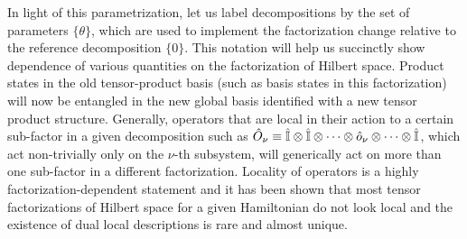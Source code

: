 \documentclass[aps,pra,onecolumn,nofootinbib,12pt,tightenlines]{revtex4-1}
\begin{document}
In light of this parametrization, let us label decompositions by the set of parameters $\{\theta \}$, which are used to implement the factorization change relative to the reference decomposition $\{0\}$. This notation will help us succinctly show dependence of various quantities on the factorization of Hilbert space. Product states in the old tensor-product basis (such as basis states in this factorization) will now be entangled in the new global basis identified with a new tensor product structure. Generally, operators that are local in their action to a certain sub-factor in a given decomposition such as $\hat{O}_{\nu} \equiv \hat{\mathbb{I}} \otimes \hat{\mathbb{I}} \otimes \cdots \otimes \hat{o}_{\nu} \otimes \cdots  \otimes \hat{\mathbb{I}}$, which act non-trivially only on the $\nu$-th subsystem, will generically act on more than one sub-factor in a different factorization. Locality of operators is a highly factorization-dependent statement and it has been shown \cite{cotler2019locality} that most tensor factorizations of Hilbert space for a given Hamiltonian do not look local and the existence of dual local descriptions is rare and almost unique.
\end{document}
